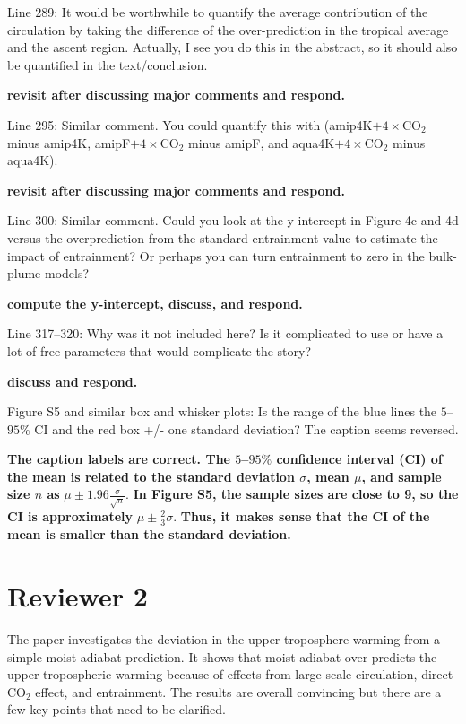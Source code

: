 \documentclass[11pt]{article}
\begin{document}
Line 289: It would be worthwhile to quantify the average contribution of the circulation by taking the difference of the over-prediction in the tropical average and the ascent region. Actually, I see you do this in the abstract, so it should also be quantified in the text/conclusion.

\textbf{revisit after discussing major comments and respond.}

Line 295: Similar comment. You could quantify this with (amip4K\(+4\times\)CO\(_2\) minus amip4K, amipF\(+4\times\)CO\(_2\) minus amipF, and aqua4K\(+4\times\)CO\(_2\) minus aqua4K).

\textbf{revisit after discussing major comments and respond.}

Line 300: Similar comment. Could you look at the y-intercept in Figure 4c and 4d versus the overprediction from the standard entrainment value to estimate the impact of entrainment? Or perhaps you can turn entrainment to zero in the bulk-plume models?

\textbf{compute the y-intercept, discuss, and respond.}

Line 317--320: Why was it not included here? Is it complicated to use or have a lot of free parameters that would complicate the story?

\textbf{discuss and respond.}

Figure S5 and similar box and whisker plots: Is the range of the blue lines the \(5\)--\(95\%\) CI and the red box +/- one standard deviation? The caption seems reversed.

\textbf{The caption labels are correct. The \(5\)--\(95\%\) confidence interval (CI) of the mean is related to the standard deviation \(\sigma\), mean \(\mu\), and sample size \(n\) as} \(\mu\pm1.96\frac{\sigma}{\sqrt{n}}\). \textbf{In Figure S5, the sample sizes are close to 9, so the CI is approximately} \(\mu\pm\frac{2}{3}\sigma\). \textbf{Thus, it makes sense that the CI of the mean is smaller than the standard deviation.}

\section*{Reviewer 2}
\label{sec:orge12eff7}

The paper investigates the deviation in the upper-troposphere warming from a simple moist-adiabat prediction. It shows that moist adiabat over-predicts the upper-tropospheric warming because of effects from large-scale circulation, direct CO\(_2\) effect, and entrainment. The results are overall convincing but there are a few key points that need to be clarified.
\end{document}
